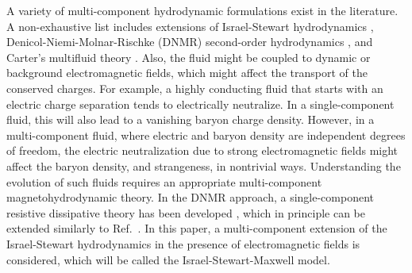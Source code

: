 \documentclass[
a4paper,
amsfonts,
amsmath,
reprint,
showkeys,
nofootinbib,
twoside,
onecolumn,
notitlepage
]{revtex4-1}
\begin{document}
	
	A variety of multi-component hydrodynamic formulations exist in the literature. 
	A non-exhaustive list includes extensions of Israel-Stewart hydrodynamics \cite{Prakash:1993bt,Monnai:2010qp,Monnai:2010th,Harutyunyan:2023nvt}, Denicol-Niemi-Molnar-Rischke (DNMR) second-order hydrodynamics \cite{Fotakis:2022usk}, and Carter's multifluid theory \cite{carter1991,Carter_starting_point,Termo}. 
	Also, the fluid might be coupled to dynamic or background electromagnetic fields, which might affect the transport of the conserved charges. 
	For example, a highly conducting fluid that starts with an electric charge separation tends to electrically neutralize. 
	In a single-component fluid, this will also lead to a vanishing baryon charge density. 
	However, in a multi-component fluid, where electric and baryon density are independent degrees of freedom, the electric neutralization due to strong electromagnetic fields might affect the baryon density, and strangeness, in nontrivial ways. 
	Understanding the evolution of such fluids requires an appropriate multi-component magnetohydrodynamic theory. 
	In the DNMR approach, a single-component resistive dissipative theory has been developed \cite{Denicol:2018rbw,Denicol:2019iyh}, which in principle can be extended similarly to Ref.\ \cite{Fotakis:2022usk}. 
	In this paper, a multi-component extension of the Israel-Stewart hydrodynamics \cite{Israel_Stewart_1979,OlsonLifsh1990} in the presence of electromagnetic fields is considered, which will be called the Israel-Stewart-Maxwell model. 
	
\end{document}
